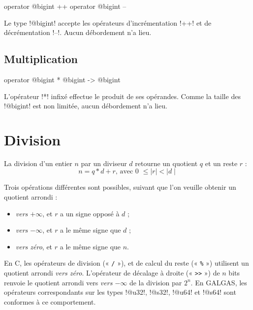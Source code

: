 \begin{galgas4box}
operator @bigint ++
operator @bigint --
\end{galgas4box}

Le type \ggsq!@bigint! accepte les opérateurs d'incrémentation \ggsq!++! et de décrémentation \ggsq!--!. Aucun débordement n'a lieu.

\subsection{Multiplication}

\begin{galgas4box}
operator @bigint * @bigint -> @bigint
\end{galgas4box}

L'opérateur \ggsq!*! infixé effectue le produit de ses opérandes. Comme la taille des \ggsq!@bigint! est non limitée, aucun débordement n'a lieu.




\section{Division}



La division d'un entier $n$ par un diviseur $d$ retourne un quotient $q$ et un reste $r$ :
\begin{equation*}
n = q * d + r\text{, avec 0 } \leqslant \mid r\mid < \mid d\mid
\end{equation*}

Trois opérations différentes sont possibles, suivant que l'on veuille obtenir un quotient arrondi :
\begin{itemize}
\item \emph{vers $+\infty$}, et $r$ a un signe opposé à $d$ ;
\item \emph{vers $-\infty$}, et $r$ a le même signe que $d$ ;
\item \emph{vers zéro}, et $r$ a le même signe que $n$.
\end{itemize}

En C, les opérateurs de division (« \texttt{/} »), et de calcul du reste (« \texttt{\%} ») utilisent un quotient arrondi \emph{vers zéro}. L'opérateur de décalage à droite (« \texttt{>{}>} ») de $n$ bits renvoie le quotient arrondi vers \emph{vers $-\infty$} de la division par $2^n$. En GALGAS, les opérateurs correspondants sur les types \ggsq!@u32!, \ggsq!@s32!, \ggsq!@u64! et \ggsq!@s64! sont conformes à ce comportement.

